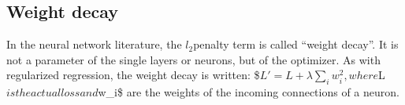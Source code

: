 \documentclass[letterpaper,10pt,english]{jupyterBook}
\begin{document}
\subsection{Weight decay}
\label{\detokenize{Regression_Techniques:weight-decay}}
\sphinxAtStartPar
In the neural network literature, the \(l_2\)\sphinxhyphen{}penalty term is called “weight decay”. It is not a parameter of the single layers or neurons, but of the optimizer. As with regularized regression, the weight decay is written:
\$\(L' = L + \lambda\sum_i w_i^2, \)\(
where \)L\( is the actual loss and \)w\_i\$ are the weights of the incoming connections of a neuron.







\renewcommand{\indexname}{Index}
\printindex
\end{document}
